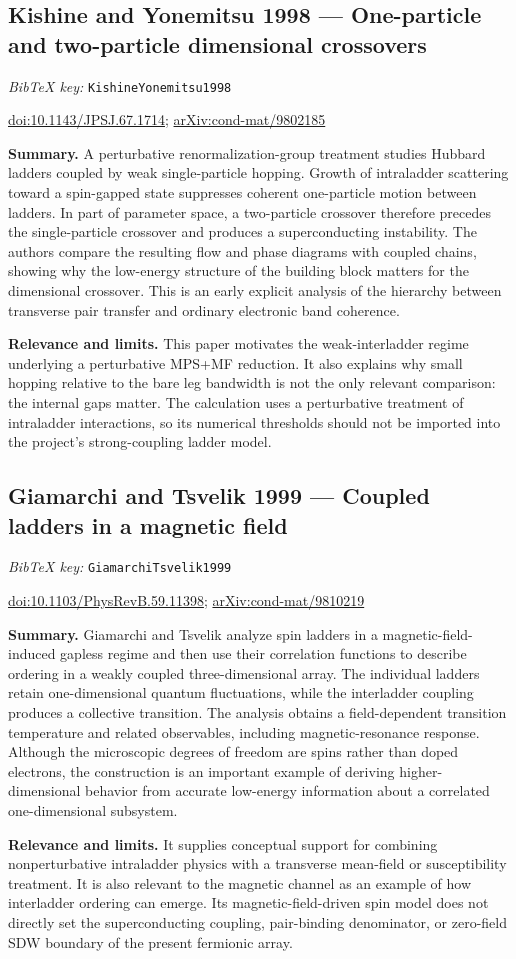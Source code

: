 \documentclass[11pt]{article}
\newcommand{\paper}[2]{\Needspace{8\baselineskip}\subsection{#2}\label{paper:#1}\textit{BibTeX key:} \texttt{#1}\quad\citep{#1}\par}
\newcommand{\doi}[1]{\href{https://doi.org/#1}{doi:#1}}
\newcommand{\arxiv}[1]{\href{https://arxiv.org/abs/#1}{arXiv:#1}}
\newcommand{\summary}{\par\textbf{Summary.} }
\newcommand{\relevance}{\par\textbf{Relevance and limits.} }
\begin{document}
\paper{KishineYonemitsu1998}{Kishine and Yonemitsu 1998 --- One-particle and two-particle dimensional crossovers}
\doi{10.1143/JPSJ.67.1714}; \arxiv{cond-mat/9802185}
\summary A perturbative renormalization-group treatment studies Hubbard ladders coupled by weak single-particle hopping. Growth of intraladder scattering toward a spin-gapped state suppresses coherent one-particle motion between ladders. In part of parameter space, a two-particle crossover therefore precedes the single-particle crossover and produces a superconducting instability. The authors compare the resulting flow and phase diagrams with coupled chains, showing why the low-energy structure of the building block matters for the dimensional crossover. This is an early explicit analysis of the hierarchy between transverse pair transfer and ordinary electronic band coherence.
\relevance This paper motivates the weak-interladder regime underlying a perturbative MPS+MF reduction. It also explains why small hopping relative to the bare leg bandwidth is not the only relevant comparison: the internal gaps matter. The calculation uses a perturbative treatment of intraladder interactions, so its numerical thresholds should not be imported into the project's strong-coupling ladder model.

\paper{GiamarchiTsvelik1999}{Giamarchi and Tsvelik 1999 --- Coupled ladders in a magnetic field}
\doi{10.1103/PhysRevB.59.11398}; \arxiv{cond-mat/9810219}
\summary Giamarchi and Tsvelik analyze spin ladders in a magnetic-field-induced gapless regime and then use their correlation functions to describe ordering in a weakly coupled three-dimensional array. The individual ladders retain one-dimensional quantum fluctuations, while the interladder coupling produces a collective transition. The analysis obtains a field-dependent transition temperature and related observables, including magnetic-resonance response. Although the microscopic degrees of freedom are spins rather than doped electrons, the construction is an important example of deriving higher-dimensional behavior from accurate low-energy information about a correlated one-dimensional subsystem.
\relevance It supplies conceptual support for combining nonperturbative intraladder physics with a transverse mean-field or susceptibility treatment. It is also relevant to the magnetic channel as an example of how interladder ordering can emerge. Its magnetic-field-driven spin model does not directly set the superconducting coupling, pair-binding denominator, or zero-field SDW boundary of the present fermionic array.
\end{document}
